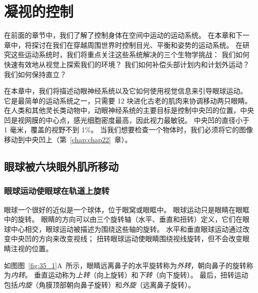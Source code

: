 \chapter{凝视的控制} \label{chap:chap35}

在前面的章节中，我们了解了控制身体在空间中运动的运动系统。
在本章和下一章中，将探讨在我们在穿越周围世界时控制目光、平衡和姿势的运动系统。
在研究这些运动系统时，我们将重点关注这些系统解决的三个生物学挑战：
我们如何快速有效地从视觉上探索我们的环境？
我们如何补偿头部计划内和计划外运动？
我们如何保持直立？


在本章中，我们将描述动眼神经系统以及它如何使用视觉信息来引导眼球运动。
它是最简单的运动系统之一，只需要 12 块进化古老的肌肉来协调移动两只眼睛。
在人类和其他灵长类动物中，动眼神经系统的主要目标是控制中央凹的位置，中央凹是视网膜的中心点，感光细胞密度最高，因此视力最敏锐。
中央凹的直径小于 1 毫米，覆盖的视野不到 1\%。
当我们想要检查一个物体时，我们必须将它的图像移动到中央凹上（第~\ref{chap:chap22}~章）。



\section{眼球被六块眼外肌所移动}

\subsection{眼球运动使眼球在轨道上旋转}

眼球一个很好的近似是一个球体，位于眼窝或眼眶中。
眼球运动只是眼睛在眼眶中的旋转。
眼睛的方向可以由三个旋转轴（水平、垂直和扭转）定义，它们在眼球中心相交，眼球运动被描述为围绕这些轴的旋转。
水平和垂直眼球运动通过改变中央凹的方向来改变视线；
扭转眼球运动使眼睛围绕视线旋转，但不会改变眼睛注视的位置。


如图图~\ref{fig:35_1}A~所示，眼睛远离鼻子的水平旋转称为\textit{外转}，朝向鼻子的旋转称为\textit{内转}。 
垂直运动称为\textit{上转}（向上旋转）和\textit{下转}（向下旋转）。
最后，扭转运动包括\textit{内旋}（角膜顶部朝向鼻子旋转）和\textit{外旋}（远离鼻子旋转）。


